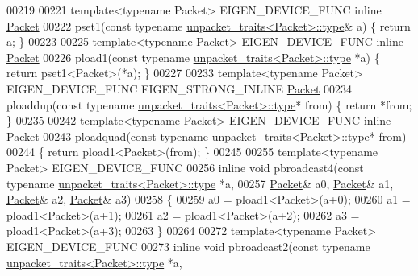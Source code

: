 \begin{DoxyCode}
00219 
00221 \textcolor{keyword}{template}<\textcolor{keyword}{typename} Packet> EIGEN\_DEVICE\_FUNC \textcolor{keyword}{inline} \hyperlink{union_eigen_1_1internal_1_1_packet}{Packet}
00222 pset1(\textcolor{keyword}{const} \textcolor{keyword}{typename} \hyperlink{union_eigen_1_1internal_1_1_packet}{unpacket\_traits<Packet>::type}& a) \{ \textcolor{keywordflow}{return} a; \}
00223 
00225 \textcolor{keyword}{template}<\textcolor{keyword}{typename} Packet> EIGEN\_DEVICE\_FUNC \textcolor{keyword}{inline} \hyperlink{union_eigen_1_1internal_1_1_packet}{Packet}
00226 pload1(\textcolor{keyword}{const} \textcolor{keyword}{typename} \hyperlink{union_eigen_1_1internal_1_1_packet}{unpacket\_traits<Packet>::type}  *a) \{ \textcolor{keywordflow}{return} 
      pset1<Packet>(*a); \}
00227 
00233 \textcolor{keyword}{template}<\textcolor{keyword}{typename} Packet> EIGEN\_DEVICE\_FUNC EIGEN\_STRONG\_INLINE \hyperlink{union_eigen_1_1internal_1_1_packet}{Packet}
00234 ploaddup(\textcolor{keyword}{const} \textcolor{keyword}{typename} \hyperlink{union_eigen_1_1internal_1_1_packet}{unpacket\_traits<Packet>::type}* from) \{ \textcolor{keywordflow}{return} *from; \}
00235 
00242 \textcolor{keyword}{template}<\textcolor{keyword}{typename} Packet> EIGEN\_DEVICE\_FUNC \textcolor{keyword}{inline} \hyperlink{union_eigen_1_1internal_1_1_packet}{Packet}
00243 ploadquad(\textcolor{keyword}{const} \textcolor{keyword}{typename} \hyperlink{union_eigen_1_1internal_1_1_packet}{unpacket\_traits<Packet>::type}* from)
00244 \{ \textcolor{keywordflow}{return} pload1<Packet>(from); \}
00245 
00255 \textcolor{keyword}{template}<\textcolor{keyword}{typename} Packet> EIGEN\_DEVICE\_FUNC
00256 \textcolor{keyword}{inline} \textcolor{keywordtype}{void} pbroadcast4(\textcolor{keyword}{const} \textcolor{keyword}{typename} \hyperlink{union_eigen_1_1internal_1_1_packet}{unpacket\_traits<Packet>::type} *a,
00257                         \hyperlink{union_eigen_1_1internal_1_1_packet}{Packet}& a0, \hyperlink{union_eigen_1_1internal_1_1_packet}{Packet}& a1, \hyperlink{union_eigen_1_1internal_1_1_packet}{Packet}& a2, 
      \hyperlink{union_eigen_1_1internal_1_1_packet}{Packet}& a3)
00258 \{
00259   a0 = pload1<Packet>(a+0);
00260   a1 = pload1<Packet>(a+1);
00261   a2 = pload1<Packet>(a+2);
00262   a3 = pload1<Packet>(a+3);
00263 \}
00264 
00272 \textcolor{keyword}{template}<\textcolor{keyword}{typename} Packet> EIGEN\_DEVICE\_FUNC
00273 \textcolor{keyword}{inline} \textcolor{keywordtype}{void} pbroadcast2(\textcolor{keyword}{const} \textcolor{keyword}{typename} \hyperlink{union_eigen_1_1internal_1_1_packet}{unpacket\_traits<Packet>::type} *a,

\end{DoxyCode}
